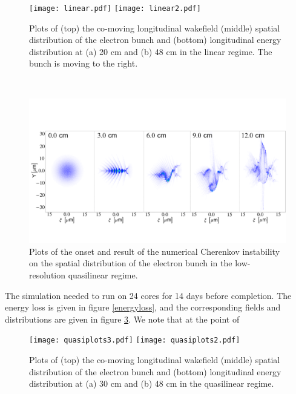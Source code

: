 \begin{figure}
\centering
\texttt{[image: linear.pdf]}\hspace{24pt}
\texttt{[image: linear2.pdf]}
\caption{\small{Plots of (top) the co-moving longitudinal wakefield (middle) spatial distribution of the electron bunch and (bottom) longitudinal energy distribution at (a) 20 cm and (b) 48 cm in the linear regime. The bunch is moving to the right.}\vspace{-5pt}}
\label{linearplots}
\end{figure}
\vspace{-4pt}\\
\begin{figure}[!ht]
\centering
\includegraphics[width=\textwidth]{CherenkovInstability}
\caption{\small{Plots of the onset and result of the numerical Cherenkov instability on the spatial distribution of the electron bunch in the low-resolution quasilinear regime.}}
\label{cherenkov}
\end{figure}
\clearpage
\noindent The simulation needed to run on 24 cores for 14 days before completion. The energy loss is given in figure \ref{energyloss}, and the corresponding fields and distributions are given in figure \ref{quasiplots}. We note that at the point of

\begin{figure}
\centering
\texttt{[image: quasiplots3.pdf]}\hspace{24pt}
\texttt{[image: quasiplots2.pdf]}
\caption{\small{Plots of (top) the co-moving longitudinal wakefield (middle) spatial distribution of the electron bunch and (bottom) longitudinal energy distribution at (a) 30 cm and (b) 48 cm in the quasilinear regime. }}
\label{quasiplots}
\end{figure}
